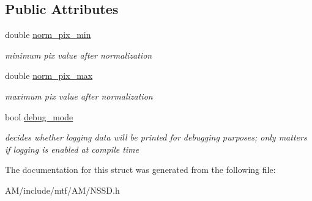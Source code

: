 \subsection*{Public Attributes}
\begin{DoxyCompactItemize}
\item 
\hypertarget{structNSSDParams_a4abf2a25a739f0b45c20e4728cf8cbad}{double \hyperlink{structNSSDParams_a4abf2a25a739f0b45c20e4728cf8cbad}{norm\-\_\-pix\-\_\-min}}\label{structNSSDParams_a4abf2a25a739f0b45c20e4728cf8cbad}

\begin{DoxyCompactList}\small\item\em minimum pix value after normalization \end{DoxyCompactList}\item 
\hypertarget{structNSSDParams_a19c25cc0bffff4524dfb5db7ebba5e63}{double \hyperlink{structNSSDParams_a19c25cc0bffff4524dfb5db7ebba5e63}{norm\-\_\-pix\-\_\-max}}\label{structNSSDParams_a19c25cc0bffff4524dfb5db7ebba5e63}

\begin{DoxyCompactList}\small\item\em maximum pix value after normalization \end{DoxyCompactList}\item 
\hypertarget{structNSSDParams_af138ffc23feaaebde058c0e631155ea9}{bool \hyperlink{structNSSDParams_af138ffc23feaaebde058c0e631155ea9}{debug\-\_\-mode}}\label{structNSSDParams_af138ffc23feaaebde058c0e631155ea9}

\begin{DoxyCompactList}\small\item\em decides whether logging data will be printed for debugging purposes; only matters if logging is enabled at compile time \end{DoxyCompactList}\end{DoxyCompactItemize}


The documentation for this struct was generated from the following file\-:\begin{DoxyCompactItemize}
\item 
A\-M/include/mtf/\-A\-M/N\-S\-S\-D.\-h\end{DoxyCompactItemize}
